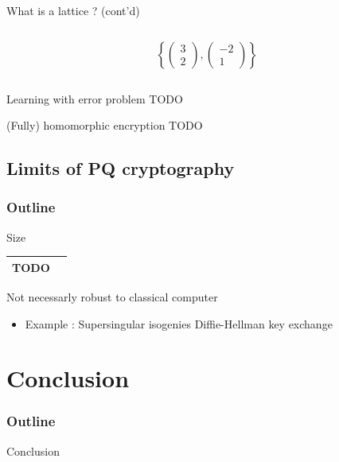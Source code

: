 \documentclass{beamer}
\begin{document}
\begin{frame}{What is a lattice ? (cont'd)}
\begin{columns}[t]
\begin{column}{0.45\textwidth}
		\[\left\{\left(\begin{matrix}3\\2\end{matrix}\right), \left(\begin{matrix}-2\\1\end{matrix}\right)\right\}\]
	\end{column}
	\end{columns}
\end{frame}

\begin{frame}{Learning with error problem}
	TODO
\end{frame}

\begin{frame}{(Fully) homomorphic encryption}
	TODO
\end{frame}

\subsection{Limits of PQ cryptography}
\begin{frame}
  \frametitle{Outline}
\end{frame}
\begin{frame}
	Size
	\begin{tabular}{|c|c|}
		\hline
		TODO & \\
		\hline
	\end{tabular}
\end{frame}

\begin{frame}{Not necessarly robust to classical computer}
	\begin{itemize}
		\item Example : Supersingular isogenies Diffie-Hellman key exchange
	\end{itemize}
\end{frame}

\section{Conclusion}
\begin{frame}
  \frametitle{Outline}
  \tableofcontents[currentsection]
\end{frame}
\begin{frame}{Conclusion}
\begin{linenumbers}
\end{linenumbers}
\end{frame}
\end{document}

